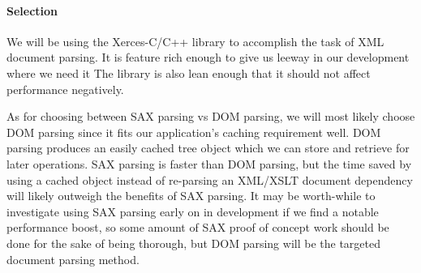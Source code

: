 \paragraph{Selection}

We will be using the Xerces-C/C++ library to accomplish the task of XML document parsing.
It is feature rich enough to give us leeway in our development where we need it
The library is also lean enough that it should not affect performance negatively.

As for choosing between SAX parsing vs DOM parsing, we will most likely choose DOM parsing since it fits our application's caching requirement well.
DOM parsing produces an easily cached tree object which we can store and retrieve for later operations.
SAX parsing is faster than DOM parsing, but the time saved by using a cached object instead of re-parsing an XML/XSLT document dependency will likely outweigh the benefits of SAX parsing.
It may be worth-while to investigate using SAX parsing early on in development if we find a notable performance boost, so some amount of SAX proof of concept work should be done for the sake of being thorough, but DOM parsing will be the targeted document parsing method.
